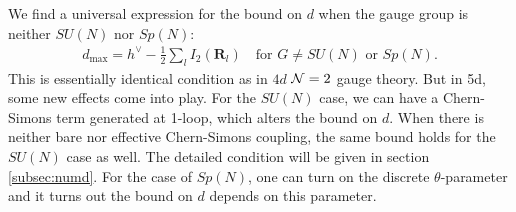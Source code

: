 \documentclass[letterpaper, 11pt]{article}
\def\CN{{\cal N}}
\begin{document}
We find a universal expression for the bound on $d$ when the gauge group is neither $SU(N)$ nor $Sp(N)$:
\begin{align}
  \label{eq:cor5d-dmax}
 d_{\textrm{max}} =  h^\vee -\frac{1}{2}\sum_l I_2(\mathbf{R}_l) \quad \textrm{for } G \neq SU(N) \textrm{ or } Sp(N).
\end{align}
This is essentially identical condition as in $4d$ $\CN=2$ gauge theory. But in 5d, some new effects come into play. 
For the $SU(N)$ case, we can have a Chern-Simons term generated at 1-loop, which alters the bound on $d$. When there is neither bare nor effective Chern-Simons coupling, the same bound holds for the $SU(N)$ case as well. The detailed condition will be given in section \ref{subsec:numd}. For the case of $Sp(N)$, one can turn on the discrete $\theta$-parameter and it turns out the bound on $d$ depends on this parameter. 
\end{document}

